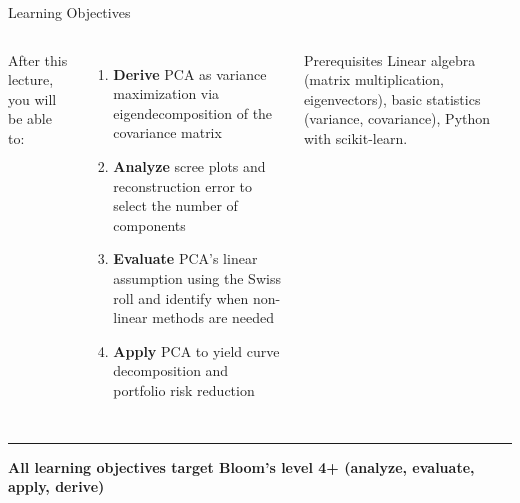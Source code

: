 \documentclass[8pt,aspectratio=169]{beamer}
\newcommand{\bottomnote}[1]{%
\vfill
\vspace{-2mm}
\textcolor{mllavender2}{\rule{\textwidth}{0.4pt}}
\vspace{1mm}
\footnotesize
\textbf{#1}
}
\newcommand{\highlight}[1]{\textcolor{mlorange}{\textbf{#1}}}
\begin{document}
\begin{frame}[t]{Learning Objectives}
\begin{columns}[T]
\small
After this lecture, you will be able to:

\vspace{3mm}
\begin{enumerate}
\setlength{\itemsep}{6pt}
\item \highlight{Derive} PCA as variance maximization via eigendecomposition of the covariance matrix
\item \highlight{Analyze} scree plots and reconstruction error to select the number of components
\item \highlight{Evaluate} PCA's linear assumption using the Swiss roll and identify when non-linear methods are needed
\item \highlight{Apply} PCA to yield curve decomposition and portfolio risk reduction
\end{enumerate}

\vspace{3mm}
\begin{block}{Prerequisites}
\scriptsize Linear algebra (matrix multiplication, eigenvectors), basic statistics (variance, covariance), Python with scikit-learn.
\end{block}
\end{columns}

\bottomnote{All learning objectives target Bloom's level 4+ (analyze, evaluate, apply, derive)}
\end{frame}
\end{document}
